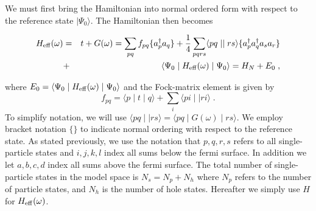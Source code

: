 \documentclass[aps,prc,twocolumn,floatfix]{revtex4}
\begin{document}
We must first bring the Hamiltonian into normal ordered
form with respect to the reference state $\mid\Psi_0\rangle$. 
The Hamiltonian then becomes 
\begin{widetext}
\begin{eqnarray}
H_{\rm eff}(\omega) &=& t+G(\omega) =\sum_{pq}f_{pq}\{a_p^\dagger a_q\}
+\frac{1}{4}\sum_{pqrs}\langle pq \mid\mid rs \rangle
\{a_p^\dagger a_q^\dagger a_s a_r\}\nonumber \\ 
&+& \langle\Psi_0\mid H_{\rm eff}(\omega)\mid\Psi_0\rangle=H_N+E_0\;,
\end{eqnarray}
\end{widetext}
where $E_0=\langle\Psi_0\mid H_{\rm eff}(\omega)\mid\Psi_0\rangle$ and
the Fock-matrix element is given by
\begin{equation}
f_{pq}=\langle p\mid t\mid q \rangle +\sum_i \langle pi\mid\mid ri \rangle\;.
\end{equation}
To simplify notation, we will use $\langle pq \mid\mid rs \rangle = 
\langle pq \mid G(\omega)\mid rs \rangle$. 
We employ bracket notation $\{\}$ to indicate normal ordering with respect
to the reference state. As stated previously, we use  the notation that
$p,q,r,s$ refers to  all single-particle states
and $i,j,k,l$ index all sums below the fermi 
surface.  In addition we let 
$a,b,c,d$ index all sums
above the fermi surface.
The total number of single-particle states in the model
space is $N_s = N_p+N_h$ where $N_p$ refers to the number of 
particle states, and $N_h$ is the number of hole states. 
Hereafter we simply use $H$ for $H_{\rm eff}(\omega)$. 
\end{document}
